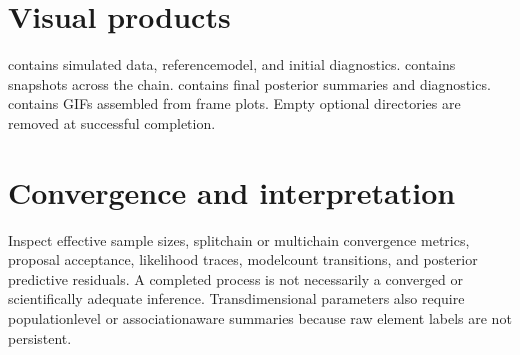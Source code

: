 \documentclass[letterpaper,10pt,english]{sphinxmanual}
\begin{document}
\section{Visual products}
\label{\detokenize{outputs:visual-products}}
\sphinxAtStartPar
{} contains simulated data, reference\sphinxhyphen{}model, and initial diagnostics.
 contains snapshots across the chain.  contains final
posterior summaries and diagnostics.  contains GIFs assembled from
frame plots. Empty optional directories are removed at successful completion.


\section{Convergence and interpretation}
\label{\detokenize{outputs:convergence-and-interpretation}}
\sphinxAtStartPar
Inspect effective sample sizes, split\sphinxhyphen{}chain or multi\sphinxhyphen{}chain convergence metrics,
proposal acceptance, likelihood traces, model\sphinxhyphen{}count transitions, and posterior
predictive residuals. A completed process is not necessarily a converged or
scientifically adequate inference. Transdimensional parameters also require
population\sphinxhyphen{}level or association\sphinxhyphen{}aware summaries because raw element labels are
not persistent.
\end{document}
